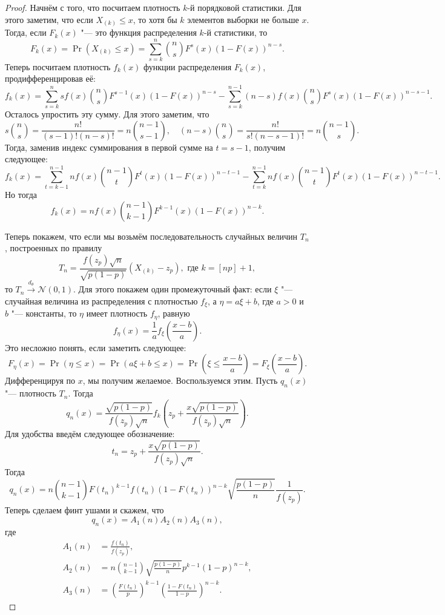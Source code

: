 \begin{proof}
	Начнём с того, что посчитаем плотность $k$-й порядковой статистики.
	Для этого заметим, что если $X_{(k)} \leq x$, то хотя бы $k$ элементов выборки не больше $x$.
	Тогда, если $F_{k}(x)$ "--- это функция распределения $k$-й статистики, то
	\[
		F_{k}(x) = \Pr(X_{(k)} \leq x) = \sum_{s = k}^{n} \binom{n}{s}F^{s}(x)(1 - F(x))^{n - s}.
	\]
	Теперь посчитаем плотность $f_{k}(x)$ функции распределения $F_{k}(x)$, продифференцировав её:
	\[
		f_{k}(x) = \sum_{s = k}^{n} sf(x)\binom{n}{s}F^{s - 1}(x)(1 - F(x))^{n - s} - \sum_{s = k}^{n - 1} (n - s)f(x)\binom{n}{s}F^{s}(x)(1 - F(x))^{n - s - 1}.
	\]
	Осталось упростить эту сумму.
	Для этого заметим, что
	\[
		s\binom{n}{s} = \frac{n!}{(s - 1)!(n - s)!} = n\binom{n - 1}{s - 1}, \quad (n - s)\binom{n}{s} = \frac{n!}{s!(n - s - 1)!} = n\binom{n - 1}{s}.
	\]
	Тогда, заменив индекс суммирования в первой сумме на $t = s - 1$, получим следующее:
	\[
		f_{k}(x) = \sum_{t = k - 1}^{n - 1} nf(x)\binom{n - 1}{t}F^{t}(x)(1 - F(x))^{n - t - 1} - \sum_{t = k}^{n - 1} nf(x)\binom{n - 1}{t}F^{t}(x)(1 - F(x))^{n - t - 1}.
	\]
	Но тогда
	\[
		f_{k}(x) = nf(x)\binom{n - 1}{k - 1}F^{k - 1}(x)(1 - F(x))^{n - k}.
	\]
	
	Теперь покажем, что если мы возьмём последовательность случайных величин $T_{n}$, построенных по правилу
	\[
		T_{n} = \frac{f(z_{p})\sqrt{n}}{\sqrt{p(1 - p)}}(X_{(k)} - z_{p}), \text{ где } k = [np] + 1,
	\]
	то $T_{n} \xrightarrow{d_{\theta}} \mathcal{N}(0, 1)$.
	Для этого покажем один промежуточный факт: если $\xi$ "--- случайная величина из распределения с плотностью $f_{\xi}$, а $\eta = a\xi + b$, где $a > 0$ и $b$ "--- константы, то $\eta$ имеет плотность $f_{\eta}$, равную
	\[
		f_{\eta}(x) = \frac{1}{a}f_{\xi}\left(\frac{x - b}{a}\right).
	\]
	Это несложно понять, если заметить следующее:
	\[
		F_{\eta}(x) = \Pr(\eta \leq x) = \Pr(a\xi + b \leq x) = \Pr\left(\xi \leq \frac{x - b}{a}\right) = F_{\xi}\left(\frac{x - b}{a}\right).
	\]
	Дифференцируя по $x$, мы получим желаемое.
	Воспользуемся этим.
	Пусть $q_{n}(x)$ "--- плотность $T_{n}$.
	Тогда
	\[
		q_{n}(x) = \frac{\sqrt{p(1 - p)}}{f(z_{p})\sqrt{n}}f_{k}\left(z_{p} + \frac{x\sqrt{p(1 - p)}}{f(z_{p})\sqrt{n}}\right).
	\]
	Для удобства введём следующее обозначение:
	\[
		t_{n} = z_{p} + \frac{x\sqrt{p(1 - p)}}{f(z_{p})\sqrt{n}}.
	\]
	Тогда
	\[
		q_{n}(x) = n\binom{n - 1}{k - 1}F(t_{n})^{k - 1}f(t_{n})(1 - F(t_{n}))^{n - k}\sqrt{\frac{p(1 - p)}{n}}\frac{1}{f(z_{p})}.
	\]
	Теперь сделаем финт ушами и скажем, что
	\[
		q_{n}(x) = A_{1}(n)A_{2}(n)A_{3}(n),
	\]
	где
	\begin{align*}
		A_{1}(n) &= \frac{f(t_{n})}{f(z_{p})}, \\
		A_{2}(n) &= n\binom{n - 1}{k - 1}\sqrt{\frac{p(1 - p)}{n}}p^{k - 1}(1 - p)^{n - k}, \\
		A_{3}(n) &= \left(\frac{F(t_{n})}{p}\right)^{k - 1}\left(\frac{1 - F(t_{n})}{1 - p}\right)^{n - k}.
	\end{align*}
	

\end{proof}
